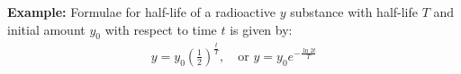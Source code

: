 \documentclass[12pt, a4paper]{article}
\begin{document}
\begin{multicols*}{3}
\textbf{Example: } Formulae for half-life of a radioactive $y$ substance with half-life $T$ and initial amount $y_0$ with respect to time $t$ is given by:
\begin{align*}
  y = y_0(\frac{1}{2})^{\frac{t}{T}},\quad \text{or }y = y_0e^{-\frac{\ln 2 t}{T}}
\end{align*}


\end{multicols*}
\end{document}
